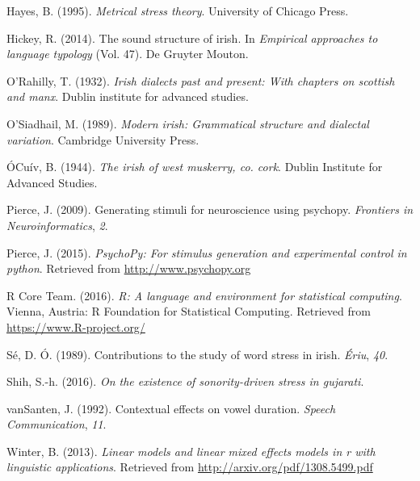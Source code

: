 \documentclass[floatsintext,man]{apa6}
\theoremstyle{definition}
\theoremstyle{definition}
\theoremstyle{definition}
\theoremstyle{remark}
\begin{document}
\hypertarget{ref-hayes95}{}
Hayes, B. (1995). \emph{Metrical stress theory}. University of Chicago
Press.

\hypertarget{ref-hickey2014}{}
Hickey, R. (2014). The sound structure of irish. In \emph{Empirical
approaches to language typology} (Vol. 47). De Gruyter Mouton.

\hypertarget{ref-orahilly1932}{}
O'Rahilly, T. (1932). \emph{Irish dialects past and present: With
chapters on scottish and manx}. Dublin institute for advanced studies.

\hypertarget{ref-osiadhail1989}{}
O'Siadhail, M. (1989). \emph{Modern irish: Grammatical structure and
dialectal variation}. Cambridge University Press.

\hypertarget{ref-ocuiv1944}{}
ÓCuív, B. (1944). \emph{The irish of west muskerry, co. cork}. Dublin
Institute for Advanced Studies.

\hypertarget{ref-psychopy2}{}
Pierce, J. (2009). Generating stimuli for neuroscience using psychopy.
\emph{Frontiers in Neuroinformatics}, \emph{2}.

\hypertarget{ref-psychopy}{}
Pierce, J. (2015). \emph{PsychoPy: For stimulus generation and
experimental control in python}. Retrieved from
\url{http://www.psychopy.org}

\hypertarget{ref-R-base}{}
R Core Team. (2016). \emph{R: A language and environment for statistical
computing}. Vienna, Austria: R Foundation for Statistical Computing.
Retrieved from \url{https://www.R-project.org/}

\hypertarget{ref-ose1989}{}
Sé, D. Ó. (1989). Contributions to the study of word stress in irish.
\emph{Ériu}, \emph{40}.

\hypertarget{ref-shih2016}{}
Shih, S.-h. (2016). \emph{On the existence of sonority-driven stress in
gujarati}.

\hypertarget{ref-vanSanten92}{}
vanSanten, J. (1992). Contextual effects on vowel duration. \emph{Speech
Communication}, \emph{11}.

\hypertarget{ref-Winter-lmer}{}
Winter, B. (2013). \emph{Linear models and linear mixed effects models
in r with linguistic applications}. Retrieved from
\url{http://arxiv.org/pdf/1308.5499.pdf}
\end{document}
